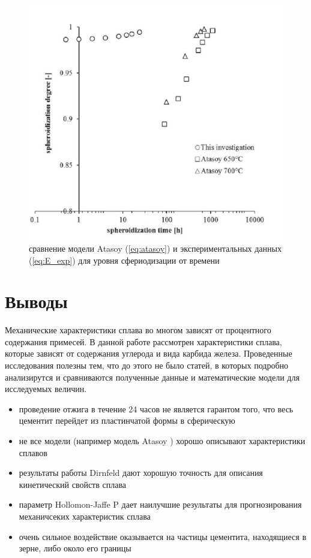 \documentclass[a4paper, 14pt]{article}
\begin{document}
	\begin{figure}[h!]
		\centering
		\includegraphics[scale=0.55]{images/degree}
			\caption{сравнение модели Atasoy (\ref{eq:atasoy}) и экспериментальных данных (\ref{eq:E_exp}) для уровня сфериодизации от времени}
	\end{figure}
	\newpage
	\section{Выводы}
	
	Механические характеристики сплава во многом зависят от процентного содержания примесей. В данной работе рассмотрен 
	характеристики сплава, которые зависят от содержания углерода и вида карбида железа. Проведенные исследования 
	полезны тем, что до этого не было статей, в которых подробно анализирутся и сравниваются полученные данные и математические модели для исследуемых величин.  
	
	\begin{itemize}
		\item проведение отжига в течение 24 часов не является гарантом того, что весь цементит перейдет из пластинчатой формы в сферическую
		
		\item не все модели (например модель Atasoy ) хорошо описывают характеристики сплавов
		
		\item результаты работы Dirnfeld дают хорошую точность для описания кинетический свойств сплава
		
		\item параметр Hollomon-Jaffe P дает наилучшие результаты для прогнозирования механичсеких характеристик 
		сплава
		
		\item очень сильное воздействие оказывается на частицы цементита, находящиеся в зерне, либо около его границы
	\end{itemize}
	
\end{document}

